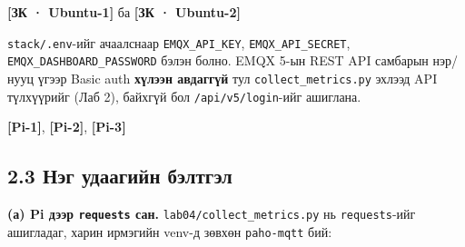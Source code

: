 \textbf{{[}ЗК · Ubuntu-1{]}} ба \textbf{{[}ЗК · Ubuntu-2{]}}

\begin{Shaded}
\begin{Highlighting}[]
\KeywordTok{\&\&} 
  \KeywordTok{\&\&} \KeywordTok{\&\&}  
\end{Highlighting}
\end{Shaded}

\texttt{stack/.env}-ийг ачаалснаар \texttt{EMQX\_\allowbreak{}API\_\allowbreak{}KEY}, \texttt{EMQX\_\allowbreak{}API\_\allowbreak{}SECRET}, \texttt{EMQX\_\allowbreak{}DASHBOARD\_\allowbreak{}PASSWORD} бэлэн болно. EMQX 5-ын REST API самбарын нэр/нууц үгээр Basic auth \textbf{хүлээн авдаггүй} тул \texttt{collect\_\allowbreak{}metrics.\allowbreak{}py} эхлээд API түлхүүрийг (Лаб 2), байхгүй бол \texttt{/api/v5/login}-ийг ашиглана.

\textbf{{[}Pi-1{]}}, \textbf{{[}Pi-2{]}}, \textbf{{[}Pi-3{]}}

\begin{Shaded}
\begin{Highlighting}[]
  \KeywordTok{\&\&} \KeywordTok{\&\&}  
\end{Highlighting}
\end{Shaded}

\hypertarget{ux43dux44dux433-ux443ux434ux430ux430ux433ux438ux439ux43d-ux431ux44dux43bux442ux433ux44dux43b}{%
\subsection{2.3 Нэг удаагийн бэлтгэл}\label{ux43dux44dux433-ux443ux434ux430ux430ux433ux438ux439ux43d-ux431ux44dux43bux442ux433ux44dux43b}}

\textbf{(а) Pi дээр \texttt{requests} сан.} \texttt{lab04/\allowbreak{}collect\_\allowbreak{}metrics.\allowbreak{}py} нь \texttt{requests}-ийг ашигладаг, харин ирмэгийн venv-д зөвхөн \texttt{paho-mqtt} бий:

